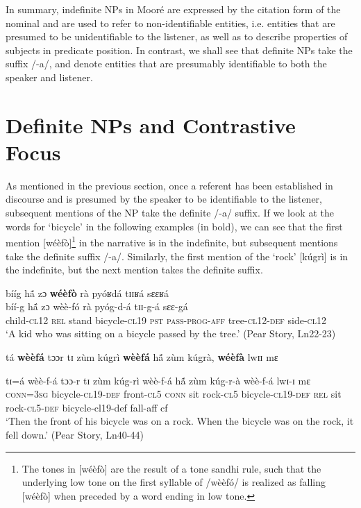 \documentclass[output=paper]{langsci/langscibook}
\begin{document}
In summary, indefinite NPs in Mooré are expressed by the citation form of the nominal and are used to refer to non-identifiable entities, i.e. entities that are presumed to be unidentifiable to the listener, as well as to describe properties of subjects in predicate position. In contrast, we shall see that definite NPs take the suffix /-a/, and denote entities that are presumably identifiable to both the speaker and listener.

\section{Definite NPs and Contrastive Focus}\label{sec:teo:6}

As mentioned in the previous section, once a referent has been established in discourse and is presumed by the speaker to be identifiable to the listener, subsequent mentions of the NP take the definite /-a/ suffix. If we look at the words for ‘bicycle’ in the following examples (in bold), we can see that the first mention [wéèfò]\footnote{The tones in [wéèfò] are the result of a tone sandhi rule, such that the underlying low tone on the first syllable of /wèèfó/ is realized as falling [wéèfò] when preceded by a word ending in low tone.} in the narrative is in the indefinite, but subsequent mentions take the definite suffix /-a/. Similarly, the first mention of the ‘rock’ [kúgrì] is in the indefinite, but the next mention takes the definite suffix.

\ea\label{ex:teo:40}
bííg h\'{ã} zɔ \textbf{wéèfò} rà pyóʁdá tɪɪʁá sɛɛʁá\\
\gll bíí-g h\'{ã} zɔ wèè-fó rà pyóg-d-á tɪɪ-g-á sɛɛ-gá\\
child-\textsc{cl}12 \textsc{rel} stand bicycle-\textsc{cl}19 \textsc{pst} \textsc{pass-prog-aff} tree-\textsc{cl12-def} side-\textsc{cl12}\\
\glt ‘A kid who was sitting on a bicycle passed by the tree.’ (Pear Story, Ln22-23)
\z

\ea\label{ex:teo:41}
tá \textbf{wèèfá} tɔɔr tɪ zùm kúgrì \textbf{wèèfá} h\'{ã} zùm kúgrà, \textbf{wéèfà} lwɪɪ mɛ

\gll tɪ=á wèè-f-á tɔɔ-r tɪ zùm kúg-rì wèè-f-á h\'{ã} zùm kúg-r-à wèè-f-á lwɪ-ɪ mɛ\\
 \textsc{conn}=3\textsc{sg} bicycle-\textsc{cl19}-\textsc{def} front-\textsc{cl}5 \textsc{conn} sit rock-\textsc{cl}5 bicycle-\textsc{cl19}-\textsc{def} \textsc{rel} sit rock-\textsc{cl}5-\textsc{def} bicycle-cl19-def fall-aff cf\\
\glt ‘Then the front of his bicycle was on a rock. When the bicycle was on the rock, it fell down.’ (Pear Story, Ln40-44)
\z
\end{document}
